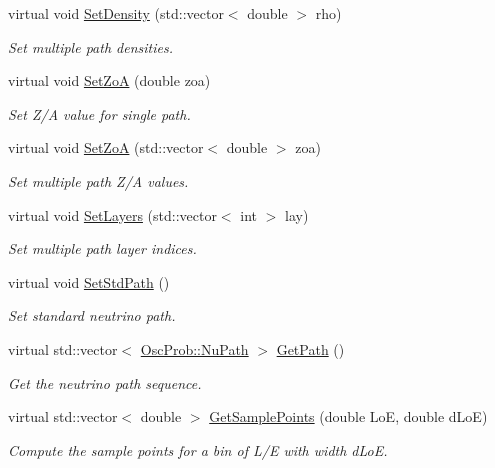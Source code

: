 \begin{DoxyCompactItemize}
virtual void \hyperlink{classOscProb_1_1PMNS__Base_a858221d5510fe732dc6a101fd305cda0}{Set\+Density} (std\+::vector$<$ double $>$ rho)
\begin{DoxyCompactList}\small\item\em Set multiple path densities. \end{DoxyCompactList}\item 
virtual void \hyperlink{classOscProb_1_1PMNS__Base_a1bf3ea8fd2507fd2fd82d7410ff8f578}{Set\+ZoA} (double zoa)
\begin{DoxyCompactList}\small\item\em Set Z/A value for single path. \end{DoxyCompactList}\item 
virtual void \hyperlink{classOscProb_1_1PMNS__Base_a8495f8a320e1a21965e6a64aec92ad2a}{Set\+ZoA} (std\+::vector$<$ double $>$ zoa)
\begin{DoxyCompactList}\small\item\em Set multiple path Z/A values. \end{DoxyCompactList}\item 
virtual void \hyperlink{classOscProb_1_1PMNS__Base_a904e580edf89fb98bf9a6397739b4ebe}{Set\+Layers} (std\+::vector$<$ int $>$ lay)
\begin{DoxyCompactList}\small\item\em Set multiple path layer indices. \end{DoxyCompactList}\item 
virtual void \hyperlink{classOscProb_1_1PMNS__Base_add6533a9fc9acdfc7ae258b62570d78d}{Set\+Std\+Path} ()
\begin{DoxyCompactList}\small\item\em Set standard neutrino path. \end{DoxyCompactList}\item 
virtual std\+::vector$<$ \hyperlink{structOscProb_1_1NuPath}{Osc\+Prob\+::\+Nu\+Path} $>$ \hyperlink{classOscProb_1_1PMNS__Base_ac8e196f2e85a2b1caaf705073ee95a5c}{Get\+Path} ()
\begin{DoxyCompactList}\small\item\em Get the neutrino path sequence. \end{DoxyCompactList}\item 
virtual std\+::vector$<$ double $>$ \hyperlink{classOscProb_1_1PMNS__Base_a9eac8d768c1424755ee41f7e783af179}{Get\+Sample\+Points} (double LoE, double d\+LoE)
\begin{DoxyCompactList}\small\item\em Compute the sample points for a bin of L/E with width d\+LoE. \end{DoxyCompactList}\item 

\end{DoxyCompactItemize}
